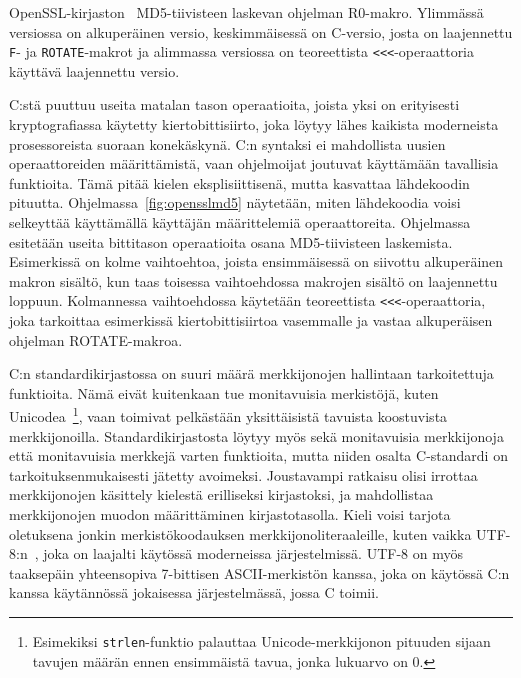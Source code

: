 \begin{listing}[ht!]
    \inputminted{C}{openssl_md5.c}

    \caption{OpenSSL-kirjaston~\citep{openssl} MD5-tiivisteen laskevan ohjelman
    R0-makro. Ylimmässä versiossa on alkuperäinen versio, keskimmäisessä on
    C-versio, josta on laajennettu \texttt{F}- ja \texttt{ROTATE}-makrot ja
    alimmassa versiossa on teoreettista \texttt{<<<}-operaattoria käyttävä
    laajennettu versio.}

    \label{fig:opensslmd5}
\end{listing}

C:stä puuttuu useita matalan tason operaatioita, joista yksi on erityisesti
kryptografiassa käytetty kiertobittisiirto, joka
löytyy lähes kaikista moderneista prosessoreista suoraan konekäskynä.
C:n syntaksi ei mahdollista uusien operaattoreiden määrittämistä, vaan
ohjelmoijat joutuvat käyttämään tavallisia funktioita. Tämä pitää kielen
eksplisiittisenä, mutta kasvattaa lähdekoodin pituutta.
Ohjelmassa~\ref{fig:opensslmd5} näytetään, miten lähdekoodia voisi selkeyttää
käyttämällä käyttäjän määrittelemiä operaattoreita. Ohjelmassa esitetään useita
bittitason operaatioita osana MD5-tiivisteen laskemista. Esimerkissä on kolme
vaihtoehtoa, joista ensimmäisessä on siivottu alkuperäinen makron sisältö, kun
taas toisessa vaihtoehdossa makrojen sisältö on laajennettu loppuun.
Kolmannessa vaihtoehdossa käytetään teoreettista \texttt{<<<}-operaattoria,
joka tarkoittaa esimerkissä kiertobittisiirtoa vasemmalle ja vastaa
alkuperäisen ohjelman ROTATE-makroa.

C:n standardikirjastossa on suuri määrä merkkijonojen hallintaan tarkoitettuja
funktioita. Nämä eivät kuitenkaan tue monitavuisia merkistöjä, kuten Unicodea~\citep{unicode11}\footnote{Esimekiksi
\texttt{strlen}-funktio palauttaa Unicode-merkkijonon pituuden sijaan tavujen
määrän ennen ensimmäistä tavua, jonka lukuarvo on 0.}, vaan toimivat pelkästään
yksittäisistä tavuista koostuvista merkkijonoilla. Standardikirjastosta löytyy
myös sekä monitavuisia merkkijonoja että monitavuisia merkkejä varten
funktioita, mutta niiden osalta C-standardi on tarkoituksenmukaisesti jätetty
avoimeksi. Joustavampi ratkaisu olisi irrottaa merkkijonojen käsittely kielestä
erilliseksi kirjastoksi, ja mahdollistaa merkkijonojen muodon määrittäminen
kirjastotasolla. Kieli voisi tarjota oletuksena jonkin
merkistökoodauksen merkkijonoliteraaleille, kuten vaikka
UTF-8:n~\citep[s. 36]{unicode11}, joka on laajalti käytössä moderneissa
järjestelmissä. UTF-8 on myös taaksepäin yhteensopiva 7-bittisen
ASCII-merkistön kanssa, joka on käytössä C:n kanssa käytännössä jokaisessa
järjestelmässä, jossa C toimii.

